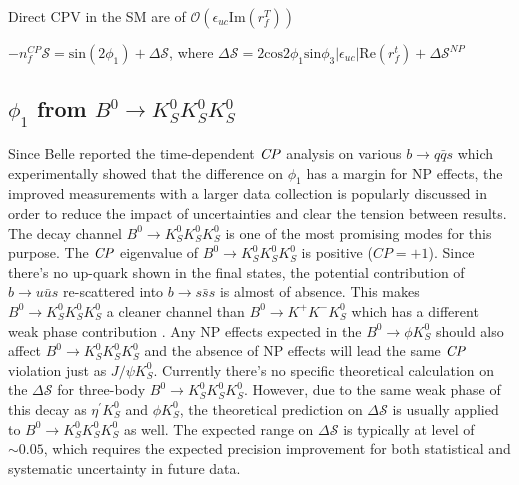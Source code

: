 \textbullet \space Direct CPV in the SM are of $\mathcal{O}(\epsilon_{uc}\text{Im}(r^T_f))$


\textbullet \space $-n^{CP}_f\mathcal{S} = \text{sin}(2\phi_1) + \Delta \mathcal{S}$, where
$\Delta \mathcal{S}=2\text{cos}2\phi_1 \text{sin}\phi_3 |\epsilon_{uc}| \text{Re}(r^t_f) + \Delta \mathcal{S}^{NP}$


\subsection{$\phi_1$ from $B^0 \to K_S^0  K_S^0  K_S^0$}%
Since Belle reported the time-dependent $\it{CP}$ analysis on various $b\to q\bar{q}s$ which experimentally showed that the difference on $\phi_1$ has a margin for NP effects\cite{chen2007observation}, the improved measurements with a larger data collection is popularly discussed in order to reduce the impact of uncertainties and clear the tension between results. The decay channel $B^0 \to K_S^0  K_S^0  K_S^0$ is one of the most promising modes for this purpose. The $\it{CP}$ eigenvalue of $B^0 \to K_S^0  K_S^0  K_S^0$ is positive ($CP=+1$). Since there's no up-quark shown in the final states, the potential contribution of $b\to u\bar{u}s$ re-scattered into $b\to s\bar{s}s$ is almost of absence. This makes $B^0 \to K_S^0  K_S^0  K_S^0$ a cleaner channel than $B^0 \to K^+  K^-  K_S^0$ which has a different weak phase contribution \cite{gershon2004time}. Any NP effects expected in the $B^0 \to \phi K^0_S$ should also affect $B^0 \to K_S^0  K_S^0  K_S^0$ and the absence of NP effects will lead the same $\it{CP}$ violation just  as $J/\psi K^0_S$\cite{gershon2004time}. Currently there's no specific theoretical calculation on the $\Delta \mathcal{S}$ for three-body $B^0 \to K_S^0  K_S^0  K_S^0$. However, due to the same weak phase of this decay as $\eta^{'} K^0_S$ and $\phi K^0_S$, the theoretical prediction on $\Delta \mathcal{S}$ is usually applied to $B^0 \to K_S^0  K_S^0  K_S^0$ as well\cite{gershon2004time}. The expected range on $\Delta \mathcal{S}$ is typically at level of  $\sim 0.05$\cite{beneke2005corrections}, which requires the expected precision improvement for both statistical and systematic uncertainty in future data.
